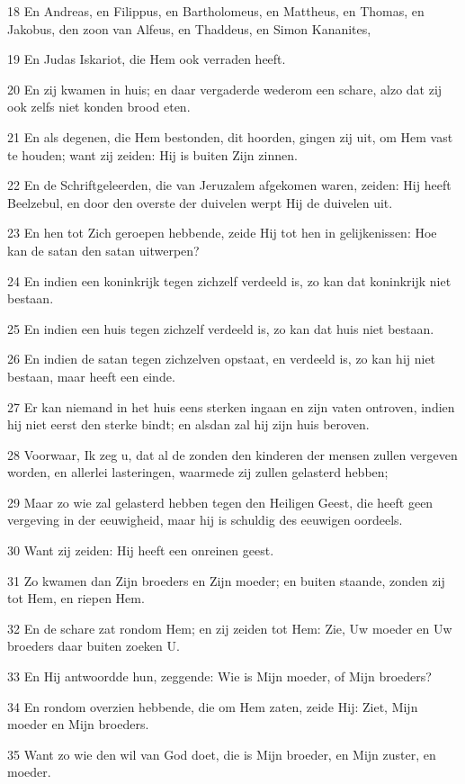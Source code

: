 \par 18 En Andreas, en Filippus, en Bartholomeus, en Mattheus, en Thomas, en Jakobus, den zoon van Alfeus, en Thaddeus, en Simon Kananites,
\par 19 En Judas Iskariot, die Hem ook verraden heeft.
\par 20 En zij kwamen in huis; en daar vergaderde wederom een schare, alzo dat zij ook zelfs niet konden brood eten.
\par 21 En als degenen, die Hem bestonden, dit hoorden, gingen zij uit, om Hem vast te houden; want zij zeiden: Hij is buiten Zijn zinnen.
\par 22 En de Schriftgeleerden, die van Jeruzalem afgekomen waren, zeiden: Hij heeft Beelzebul, en door den overste der duivelen werpt Hij de duivelen uit.
\par 23 En hen tot Zich geroepen hebbende, zeide Hij tot hen in gelijkenissen: Hoe kan de satan den satan uitwerpen?
\par 24 En indien een koninkrijk tegen zichzelf verdeeld is, zo kan dat koninkrijk niet bestaan.
\par 25 En indien een huis tegen zichzelf verdeeld is, zo kan dat huis niet bestaan.
\par 26 En indien de satan tegen zichzelven opstaat, en verdeeld is, zo kan hij niet bestaan, maar heeft een einde.
\par 27 Er kan niemand in het huis eens sterken ingaan en zijn vaten ontroven, indien hij niet eerst den sterke bindt; en alsdan zal hij zijn huis beroven.
\par 28 Voorwaar, Ik zeg u, dat al de zonden den kinderen der mensen zullen vergeven worden, en allerlei lasteringen, waarmede zij zullen gelasterd hebben;
\par 29 Maar zo wie zal gelasterd hebben tegen den Heiligen Geest, die heeft geen vergeving in der eeuwigheid, maar hij is schuldig des eeuwigen oordeels.
\par 30 Want zij zeiden: Hij heeft een onreinen geest.
\par 31 Zo kwamen dan Zijn broeders en Zijn moeder; en buiten staande, zonden zij tot Hem, en riepen Hem.
\par 32 En de schare zat rondom Hem; en zij zeiden tot Hem: Zie, Uw moeder en Uw broeders daar buiten zoeken U.
\par 33 En Hij antwoordde hun, zeggende: Wie is Mijn moeder, of Mijn broeders?
\par 34 En rondom overzien hebbende, die om Hem zaten, zeide Hij: Ziet, Mijn moeder en Mijn broeders.
\par 35 Want zo wie den wil van God doet, die is Mijn broeder, en Mijn zuster, en moeder.

